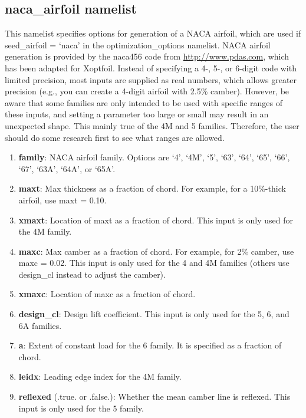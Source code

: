 \documentclass[11pt]{article}
\begin{document}
\subsection{naca\_airfoil namelist}

This namelist specifies options for generation of a NACA airfoil, which are used if 
seed\_airfoil = `naca' in the optimization\_options namelist. NACA airfoil generation is
provided by the naca456 code from \url{http://www.pdas.com}, which has been adapted for
Xoptfoil. Instead of specifying a 4-, 5-, or 6-digit code with limited precision, most
inputs are supplied as real numbers, which allows greater precision (e.g., you can create
a 4-digit airfoil with 2.5\% camber). However, be aware that some families are only
intended to be used with specific ranges of these inputs, and setting a parameter too
large or small may result in an unexpected shape. This mainly true of the 4M and 5
families. Therefore, the user should do some research first to see what ranges are
allowed.

\begin{enumerate}
\item{\textbf{family}: NACA airfoil family. Options are `4', `4M', `5', `63', `64', `65',
`66', `67', `63A', `64A', or `65A'.}
\item{\textbf{maxt}: Max thickness as a fraction of chord. For example, for a 10\%-thick
airfoil, use maxt = 0.10.}
\item{\textbf{xmaxt}: Location of maxt as a fraction of chord. This input is only used for
the 4M family.}
\item{\textbf{maxc}: Max camber as a fraction of chord. For example, for 2\% camber, use
maxc = 0.02. This input is only used for the 4 and 4M families (others use design\_cl 
instead to adjust the camber).} 
\item{\textbf{xmaxc}: Location of maxc as a fraction of chord.}
\item{\textbf{design\_cl}: Design lift coefficient. This input is only used for the 5, 6,
and 6A families.}
\item{\textbf{a}: Extent of constant load for the 6 family. It is specified as a fraction
of chord.}
\item{\textbf{leidx}: Leading edge index for the 4M family.}
\item{\textbf{reflexed} (.true. or .false.): Whether the mean camber line is reflexed.
This input is only used for the 5 family.}
\end{enumerate}
\end{document}
